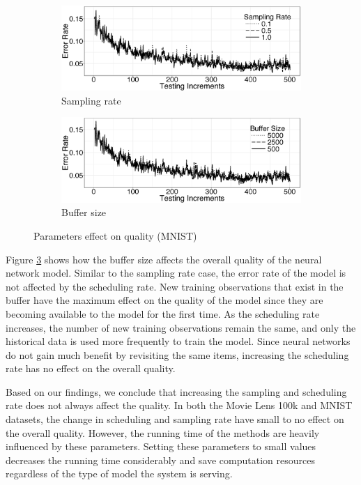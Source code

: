 \documentclass{vldb}
\begin{document}
\begin{figure}[h]
\begin{subfigure}{\columnwidth}
\centering
\includegraphics[width=\columnwidth]{../images/experiment-results/mnist-sampling-improved.eps}
\caption{Sampling rate}
\label{fig:mnist-sample-rate}
\end{subfigure}
\begin{subfigure}{\columnwidth}
\centering
\includegraphics[width=\columnwidth]{../images/experiment-results/mnist-buffersize-improved.eps}
\caption{Buffer size}
\label{fig:mnist-buffer-size}
\end{subfigure}
\vspace{2mm}
\caption{Parameters effect on quality (MNIST)}
\end{figure}

Figure \ref{fig:mnist-buffer-size} shows how the buffer size affects the overall quality of the neural network model.
Similar to the sampling rate case, the error rate of the model is not affected by the scheduling rate.
New training observations that exist in the buffer have the maximum effect on the quality of the model since they are becoming available to the model for the first time.
As the scheduling rate increases, the number of new training observations remain the same, and only the historical data is used more frequently to train the model.
Since neural networks do not gain much benefit by revisiting the same items, increasing the scheduling rate has no effect on the overall quality.

Based on our findings, we conclude that increasing the sampling and scheduling rate does not always affect the quality.
In both the Movie Lens 100k and MNIST datasets, the change in scheduling and sampling rate have small to no effect on the overall quality.
However, the running time of the methods are heavily influenced by these parameters.
Setting these parameters to small values decreases the running time considerably and save computation resources regardless of the type of model the system is serving.
\end{document}

